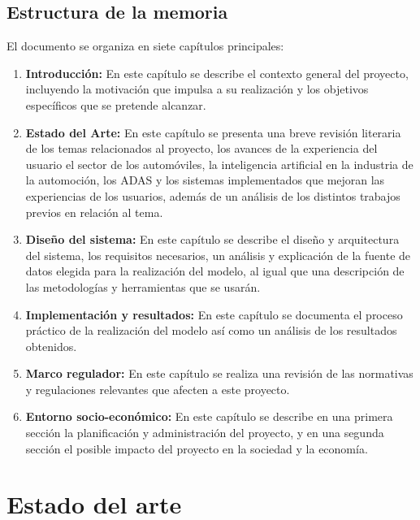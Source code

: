 \documentclass[12pt]{report} %
\begin{document}
\section{Estructura de la memoria}

El documento se organiza en siete capítulos principales:

\begin{enumerate}

    \item \textbf{Introducción:} En este capítulo se describe el contexto general del proyecto, incluyendo la motivación que impulsa a su realización y los objetivos específicos que se pretende alcanzar.
    \item \textbf{Estado del Arte:} En este capítulo se presenta una breve revisión literaria de los temas relacionados al proyecto, los avances de la experiencia del usuario el sector de los automóviles, la inteligencia artificial en la industria de la automoción, los ADAS y los sistemas implementados que mejoran las experiencias de los usuarios, además de un análisis de los  distintos trabajos previos en relación al tema. 
    \item \textbf{Diseño del sistema:} En este capítulo se describe el diseño y arquitectura del sistema, los requisitos necesarios, un análisis y explicación de la fuente de datos elegida para la realización del modelo, al igual que una descripción de las metodologías y herramientas que se usarán. 
    \item \textbf{Implementación y resultados:} En este capítulo se documenta el proceso práctico de la realización del modelo así como un análisis de los resultados obtenidos.
    \item \textbf{Marco regulador:} En este capítulo se realiza una revisión de las normativas y regulaciones relevantes que afecten a este proyecto. 
    \item \textbf{Entorno socio-económico:} En este capítulo se describe en una primera sección la planificación y administración del proyecto, y en una segunda sección el posible impacto del proyecto en la sociedad y la economía.

\end{enumerate}



\chapter{Estado del arte}
\end{document}
